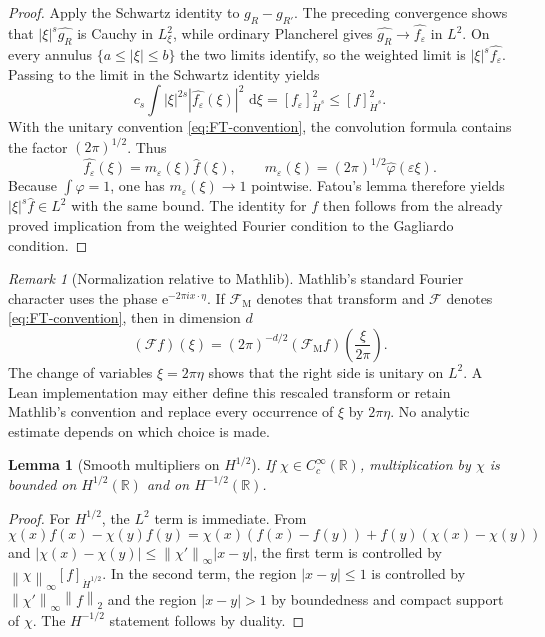\documentclass[11pt,oneside]{book}
\newtheorem{lemma}[theorem]{Lemma}
\theoremstyle{definition}
\theoremstyle{remark}
\newtheorem{remark}[theorem]{Remark}
\newcommand{\R}{\mathbb R}
\newcommand{\1}{\mathbf 1}
\newcommand{\dd}{\,\mathrm d}
\newcommand{\norm}[1]{\left\lVert #1\right\rVert}
\newcommand{\FT}{\mathcal F}
\newcommand{\e}{\mathrm e}
\newcommand{\eps}{\varepsilon}
\begin{document}
\begin{proof}
Apply the Schwartz identity to $g_R-g_{R'}$.  The preceding convergence shows
that $|\xi|^s\widehat{g_R}$ is Cauchy in $L^2_\xi$, while ordinary
Plancherel gives $\widehat{g_R}\to\widehat{f_\eps}$ in $L^2$.  On every
annulus $\{a\le|\xi|\le b\}$ the two limits identify, so the weighted
limit is $|\xi|^s\widehat{f_\eps}$.  Passing to the limit in the Schwartz
identity yields
\[
 c_s\int|\xi|^{2s}|\widehat{f_\eps}(\xi)|^2\,\dd\xi
 =[f_\eps]_{\dot H^s}^2
 \le[f]_{\dot H^s}^2.
\]
With the unitary convention \eqref{eq:FT-convention}, the convolution
formula contains the factor $(2\pi)^{1/2}$.  Thus
\[
 \widehat{f_\eps}(\xi)=m_\eps(\xi)\widehat f(\xi),
 \qquad
 m_\eps(\xi)=(2\pi)^{1/2}\widehat\varphi(\eps\xi).
\]
Because $\int\varphi=1$, one has $m_\eps(\xi)\to1$ pointwise.
Fatou's lemma therefore yields
$|\xi|^s\widehat f\in L^2$ with the same bound.  The identity for $f$
then follows from the already proved implication from the weighted Fourier
condition to the Gagliardo condition.
\end{proof}

\begin{remark}[Normalization relative to Mathlib]\label{rem:mathlib-fourier-normalization}
Mathlib's standard Fourier character uses the phase $\e^{-2\pi i x\cdot\eta}$.
If $\FT_{\mathrm M}$ denotes that transform and $\FT$ denotes
\eqref{eq:FT-convention}, then in dimension $d$
\begin{equation}
 (\FT f)(\xi)=(2\pi)^{-d/2}
 (\FT_{\mathrm M}f)\!\left(\frac{\xi}{2\pi}\right).
 \label{eq:mathlib-fourier-rescaling}
\end{equation}
The change of variables $\xi=2\pi\eta$ shows that the right side is unitary
on $L^2$.  A Lean implementation may either define this rescaled transform or
retain Mathlib's convention and replace every occurrence of $\xi$ by
$2\pi\eta$.  No analytic estimate depends on which choice is made.
\end{remark}

\begin{lemma}[Smooth multipliers on $H^{1/2}$]\label{lem:smooth-multiplier}
If $\chi\in C_c^\infty(\R)$, multiplication by $\chi$ is bounded on
$H^{1/2}(\R)$ and on $H^{-1/2}(\R)$.
\end{lemma}

\begin{proof}
For $H^{1/2}$, the $L^2$ term is immediate.  From
\[
 \chi(x)f(x)-\chi(y)f(y)
 =\chi(x)(f(x)-f(y))+f(y)(\chi(x)-\chi(y))
\]
and $|\chi(x)-\chi(y)|\le \norm{\chi'}_\infty|x-y|$, the first term is
controlled by $\norm{\chi}_\infty[f]_{\dot H^{1/2}}$.  In the second term,
the region $|x-y|\le1$ is controlled by $\norm{\chi'}_\infty\norm f_2$ and
the region $|x-y|>1$ by boundedness and compact support of $\chi$.  The
$H^{-1/2}$ statement follows by duality.
\end{proof}
\end{document}
